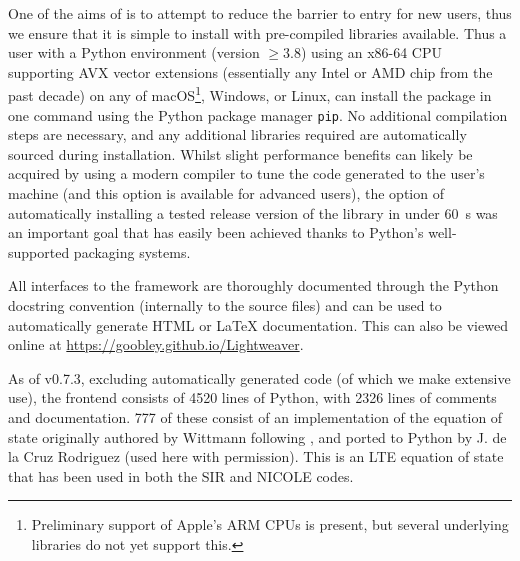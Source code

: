 One of the aims of \Lw{} is to attempt to reduce the barrier to entry for new users, thus we ensure that it is simple to install with pre-compiled libraries available.
Thus a user with a Python environment (version $\ge3.8$) using an x86-64 CPU supporting AVX vector extensions (essentially any Intel or AMD chip from the past decade) on any of macOS\footnote{Preliminary support of Apple's ARM CPUs is present, but several underlying libraries do not yet support this.}, Windows, or Linux, can install the package in one command using the Python package manager \texttt{pip}.
No additional compilation steps are necessary, and any additional libraries required are automatically sourced during installation.
Whilst slight performance benefits can likely be acquired by using a modern compiler to tune the code generated to the user's machine (and this option is available for advanced users), the option of automatically installing a tested release version of the library in under \SI{60}{\second} was an important goal that has easily been achieved thanks to Python's well-supported packaging systems.

All interfaces to the framework are thoroughly documented through the Python docstring convention (internally to the source files) and can be used to automatically generate HTML or \LaTeX{} documentation.
This can also be viewed online at \url{https://goobley.github.io/Lightweaver}.

As of v0.7.3, excluding automatically generated code (of which we make extensive use), the \Lw{} frontend consists of 4520 lines of Python, with 2326 lines of comments and documentation.
777 of these consist of an implementation of the equation of state originally authored by Wittmann following \citet{Mihalas1978}, and ported to Python by J. de la Cruz Rodriguez (used here with permission).
This is an LTE equation of state that has been used in both the SIR \citep{1992RuizCobo} and NICOLE \citep{Socas-Navarro2015} codes.

